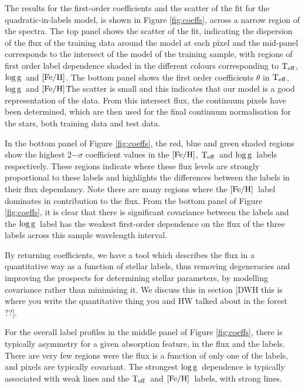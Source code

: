 \documentclass[12pt, preprint]{aastex}
\newcommand{\teff}{\mbox{$\rm T_{eff}$}}
\newcommand{\feh}{\mbox{$\rm [Fe/H]$}}
\newcommand{\logg}{\mbox{$\rm \log g$}}
\begin{document}
The results for the first-order coefficients and the scatter of the fit for the quadratic-in-labels model, is shown in Figure \ref{fig:coeffs}, across a narrow region of the spectra. The top panel shows the scatter of the fit, indicating the dispersion of the flux of the training data around the model at each pixel and the mid-panel corresponds to the intersect of the model of the training sample, with regions of first order label dependence shaded in the different colours corresponding to \teff, \logg\ and \feh. The bottom panel shows the first order coefficients $\theta$ in \teff, \logg\ and \feh\.  The scatter is small and this indicates that our model is a good representation of the data. From this intersect flux, the continuum pixels have been determined, which  are then used for the final continuum normalisation for the stars, both training data and test data. 

 In the bottom panel of Figure \ref{fig:coeffs}, the red, blue and green shaded regions show the highest 2$-\sigma$ coefficient values in the \feh, \teff\ and \logg\ labels respectively. These regions indicate where these flux levels are strongly proportional to these labels and highlights the differences between the labels in their flux dependancy. Note there are many regions where the \feh\ label dominates in contribution to the flux. From the bottom panel of Figure \ref{fig:coeffs}, it is clear that there is significant covariance between the labels and the \logg\ label has the weakest first-order dependence on the flux of the three labels across this sample wavelength interval. 

By returning coefficients, we have a tool which describes the flux in a quantitative way as a function of stellar labels, thus removing degeneracies and improving the prospects for determining stellar parameters, by modelling covariance rather than minimising it. We discuss this in section [DWH this is where you write the quantitative thing you and HW talked about in the forest ??].

For the overall label profiles in the middle panel of Figure \ref{fig:coeffs}, there is typically asymmetry for a given absorption feature, in the flux and the labels. There are very few regions were the flux is a function of only one of the labels, and pixels are typically covariant. The strongest \logg\ dependence is typically associated with weak lines and the \teff\ and \feh\ labels, with strong lines. 
\end{document}
